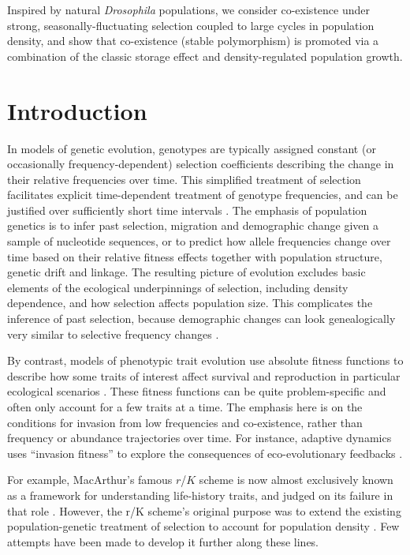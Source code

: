 \documentclass[11pt]{article}
\begin{document}
Inspired by natural \textit{Drosophila} populations, we consider co-existence under strong, seasonally-fluctuating selection coupled to large cycles in population density, and show that co-existence (stable polymorphism) is promoted via a combination of the classic storage effect and density-regulated population growth. 


\newpage{}


\section*{Introduction}


In models of genetic evolution, genotypes are typically assigned constant (or occasionally frequency-dependent) selection coefficients describing the change in their relative frequencies over time. This simplified treatment of selection facilitates explicit time-dependent treatment of genotype frequencies, and can be justified over sufficiently short time intervals \citep[p. 276]{ewens_2004}. The emphasis of population genetics is to infer past selection, migration and demographic change given a sample of nucleotide sequences, or to predict how allele frequencies change over time based on their relative fitness effects together with population structure, genetic drift and linkage. The resulting picture of evolution excludes basic elements of the ecological underpinnings of selection, including density dependence, and how selection affects population size. This complicates the inference of past selection, because demographic changes can look genealogically very similar to selective frequency changes \citep{barton_1998}. 

By contrast, models of phenotypic trait evolution use absolute fitness functions to describe how some traits of interest affect survival and reproduction in particular ecological scenarios \citep{metz_1992,diekmann_2004}. These fitness functions can be quite problem-specific and often only account for a few traits at a time. The emphasis here is on the conditions for invasion from low frequencies and co-existence, rather than frequency or abundance trajectories over time. For instance, adaptive dynamics uses ``invasion fitness'' to explore the consequences of eco-evolutionary feedbacks \citep{diekmann_2004}.


 

 For example, MacArthur's famous $r$/$K$ scheme \citep{macarthur_1962,macarthur_1967} is now almost exclusively known as a framework for understanding life-history traits, and judged on its failure in that role \citep{pianka_1970,stearns_1977,boyce_1984,reznick_2002}. However, the r/K scheme's original purpose was to extend the existing population-genetic treatment of selection to account for population density \citep{macarthur_1962}. Few attempts have been made to develop it further along these lines. 
\end{document}
